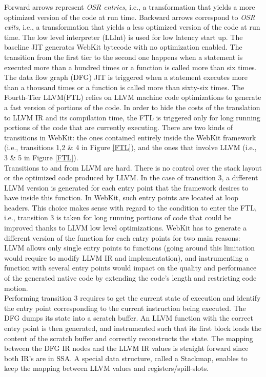 Forward arrows represent \textit{OSR entries}, i.e., a transformation that yields a more optimized version of the code at run time.
Backward arrows correspond to \textit{OSR exits}, i.e., a transformation that yields a less optimized version of the code at run time.
The low level interpreter (LLInt) is used for low latency start up.
The baseline JIT generates WebKit bytecode with no optimization enabled.
The transition from the first tier to the second one happens when a statement is executed more than a hundred times or a function is called more than six times.
The data flow graph (DFG) JIT is triggered when a statement executes more than a thousand times or a function is called more than sixty-six times.
The Fourth-Tier LLVM(FTL)\cite{WebKitFTL} relies on LLVM machine code optimizations to generate a fast version of portions of the code.
In order to hide the costs of the translation to LLVM IR and its compilation time, the FTL is triggered only for long running portions of the code that are currently executing.
There are two kinds of transitions in WebKit: the ones contained entirely inside the WebKit framework (i.e., transitions 1,2 \& 4 in Figure \ref{FTL}), and the ones that involve LLVM (i.e., 3 \& 5 in Figure \ref{FTL}).\\

Transitions to and from LLVM are hard. 
There is no control over the stack layout or the optimized code produced by LLVM.
In the case of transition 3, a different LLVM version is generated for each entry point that the framework desires to have inside this function.
In WebKit, such entry points are located at loop headers. 
This choice makes sense with regard to the condition to enter the FTL, i.e., transition 3 is taken for long running portions of code that could be improved thanks to LLVM low level optimizations.
WebKit has to generate a different version of the function for each entry points for two main reasons: LLVM allows only single entry points to functions (going around this limitation would require to modify LLVM IR and implementation), and instrumenting a function with several entry points would impact on the quality and performance of the generated native code by extending the code's length and restricting code motion.\\

Performing transition 3 requires to get the current state of execution and identify the entry point corresponding to the current instruction being executed.
The DFG dumps its state into a scratch buffer.
An LLVM function with the correct entry point is then generated, and instrumented such that its first block loads the content of the scratch buffer and correctly reconstructs the state.
The mapping between the DFG IR nodes and the LLVM IR values is straight forward since both IR's are in SSA.
A special data structure, called a Stackmap, enables to keep the mapping between LLVM values and registers/spill-slots.\\

